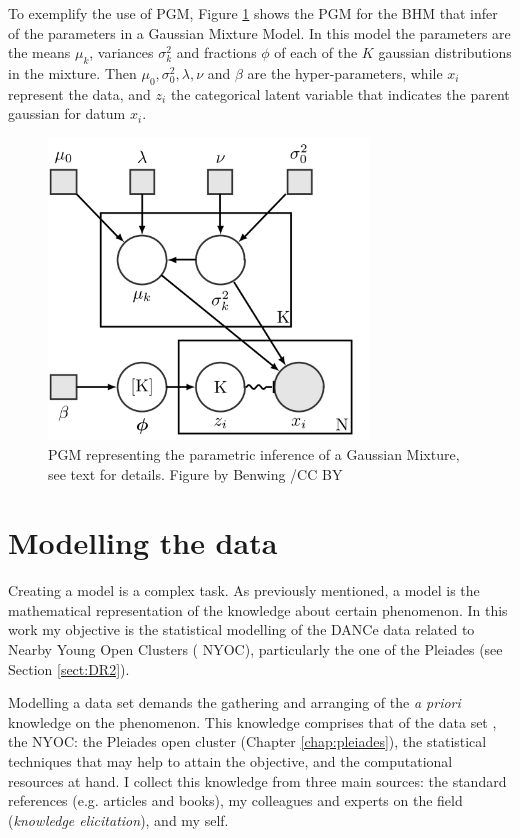 To exemplify the use of PGM, Figure \ref{fig:pgmGMM} shows the PGM for the BHM that infer of the parameters in a Gaussian Mixture Model. In this model the parameters are the means $\mu_k$, variances $\sigma_k^2$ and fractions $\phi$ of each of the $K$ gaussian distributions in the mixture. Then $\mu_0,\sigma_0^2,\lambda,\nu$ and $\beta$ are the hyper-parameters, while $x_i$ represent the data, and $z_i$ the categorical latent variable that indicates the parent gaussian for datum $x_i$.

\begin{figure}[ht!]
\begin{center}
\includegraphics[height=8cm]{background/Figures/BGMM.png}
\caption{PGM representing the parametric inference of a Gaussian Mixture, see text for details. Figure by Benwing /CC BY}
\label{fig:pgmGMM}
\end{center}
\end{figure}

\section{Modelling the data}
\label{sect:datamodelling}
Creating a model is a complex task. As previously mentioned, a model is the mathematical representation of the knowledge about certain phenomenon. In this work my objective is the statistical modelling of the DANCe data related to Nearby Young Open Clusters ( NYOC), particularly the one of the Pleiades (see Section \ref{sect:DR2}).

Modelling a data set demands the gathering and arranging of the \emph{a priori} knowledge on the phenomenon. This knowledge comprises that of the data set , the NYOC: the Pleiades open cluster (Chapter \ref{chap:pleiades}), the statistical techniques that may help to attain the objective, and the computational resources at hand. I collect this knowledge from three main sources: the standard references (e.g. articles and books), my colleagues and experts on the field (\emph{knowledge elicitation}), and my self.

